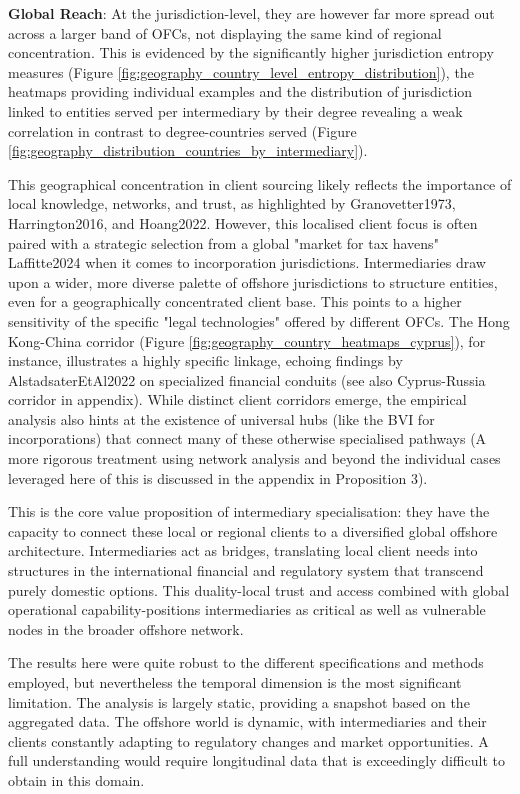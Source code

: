 \textbf{Global Reach}: At the jurisdiction-level, they are however far more spread out across a larger band of OFCs, not displaying the same kind of regional concentration. This is evidenced by the significantly higher jurisdiction entropy measures (Figure \ref{fig:geography_country_level_entropy_distribution}), the heatmaps providing individual examples and the distribution of jurisdiction linked to entities served per intermediary by their degree revealing a weak correlation in contrast to degree-countries served (Figure \ref{fig:geography_distribution_countries_by_intermediary}).

This geographical concentration in client sourcing likely reflects the importance of local knowledge, networks, and trust, as highlighted by Granovetter1973, Harrington2016, and Hoang2022. However, this localised client focus is often paired with a strategic selection from a global "market for tax havens" Laffitte2024 when it comes to incorporation jurisdictions. Intermediaries draw upon a wider, more diverse palette of offshore jurisdictions to structure entities, even for a geographically concentrated client base. This points to a higher sensitivity of the specific "legal technologies" offered by different OFCs. The Hong Kong-China corridor (Figure \ref{fig:geography_country_heatmaps_cyprus}), for instance, illustrates a highly specific linkage, echoing findings by AlstadsaterEtAl2022 on specialized financial conduits (see also Cyprus-Russia corridor in appendix). While distinct client corridors emerge, the empirical analysis also hints at the existence of universal hubs (like the BVI for incorporations) that connect many of these otherwise specialised pathways (A more rigorous treatment using network analysis and beyond the individual cases leveraged here of this is discussed in the appendix in Proposition 3).

This is the core value proposition of intermediary specialisation: they have the capacity to connect these local or regional clients to a diversified global offshore architecture. Intermediaries act as bridges, translating local client needs into structures in the international financial and regulatory system that transcend purely domestic options. This duality-local trust and access combined with global operational capability-positions intermediaries as critical as well as vulnerable nodes in the broader offshore network.

The results here were quite robust to the different specifications and methods employed, but nevertheless the temporal dimension is the most significant limitation. The analysis is largely static, providing a snapshot based on the aggregated data. The offshore world is dynamic, with intermediaries and their clients constantly adapting to regulatory changes and market opportunities. A full understanding would require longitudinal data that is exceedingly difficult to obtain in this domain.

